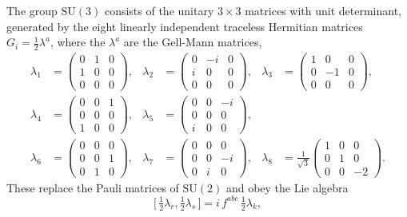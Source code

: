 The group $\mathrm{SU}(3)$ consists of the unitary $3 \times 3$ matrices with unit
determinant, generated by the eight linearly independent traceless Hermitian
matrices $G_i = \tfrac{1}{2}\lambda^{a}$, where the $\lambda^{a}$ are the Gell-Mann
matrices,
\begin{equation}
\begin{aligned}
    \lambda_1 &= \begin{pmatrix} 0&1&0\\1&0&0\\0&0&0 \end{pmatrix},
    & \lambda_2 &= \begin{pmatrix} 0&-i&0\\i&0&0\\0&0&0 \end{pmatrix},
    & \lambda_3 &= \begin{pmatrix} 1&0&0\\0&-1&0\\0&0&0 \end{pmatrix}, \\[4pt]
    \lambda_4 &= \begin{pmatrix} 0&0&1\\0&0&0\\1&0&0 \end{pmatrix},
    & \lambda_5 &= \begin{pmatrix} 0&0&-i\\0&0&0\\i&0&0 \end{pmatrix},
    & & \\[4pt]
    \lambda_6 &= \begin{pmatrix} 0&0&0\\0&0&1\\0&1&0 \end{pmatrix},
    & \lambda_7 &= \begin{pmatrix} 0&0&0\\0&0&-i\\0&i&0 \end{pmatrix},
    & \lambda_8 &= \frac{1}{\sqrt{3}}\begin{pmatrix} 1&0&0\\0&1&0\\0&0&-2 \end{pmatrix}.
\end{aligned}
\label{eq:gellmann}
\end{equation}
These replace the Pauli matrices of $\mathrm{SU}(2)$ and obey the Lie algebra
\begin{equation}
    \big[\,\tfrac{1}{2}\lambda_r, \tfrac{1}{2}\lambda_s\,\big]
    = i\,f^{abc}\,\tfrac{1}{2}\lambda_k ,
\end{equation}
